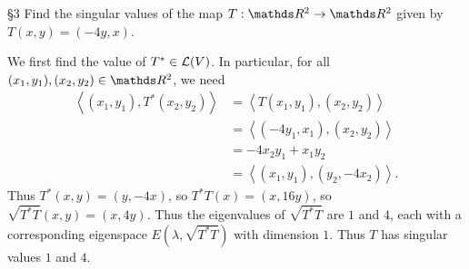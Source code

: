 \documentclass{homework}
\begin{document}
\begin{problem}{\S 3}
  Find the singular values of the map $T:\R^2\to \R^2$ given by $T(x,y)=(-4y,x)$.
\end{problem}
\begin{solution}
  We first find the value of $T^*\in \mathcal{L}(V)$. In particular, for all $(x_1,y_1), (x_2,y_2)\in
  \R^2$, we need
  \begin{align*}
    \left<(x_1,y_1),T^*(x_2,y_2) \right> &= \left<T(x_1,y_1),(x_2,y_2) \right>  \\
                                         &= \left<(-4y_1,x_1),(x_2,y_2) \right> \\
                                         &= -4x_2y_1+x_1y_2 \\
                                         &= \left<(x_1,y_1),(y_2,-4x_2) \right>
  .\end{align*}
  Thus $T^*(x,y)=(y,-4x)$, so $T^*T(x)=(x, 16y)$, so $\sqrt{T^*T}(x,y)=(x,4y)$. Thus the eigenvalues
  of $\sqrt{T^*T}$ are $1$ and $4$, each with a corresponding eigenspace $E(\lambda,\sqrt{T^*T})$
  with dimension $1$. Thus $T$ has singular values $1$ and $4$.
\end{solution}
\end{document}

